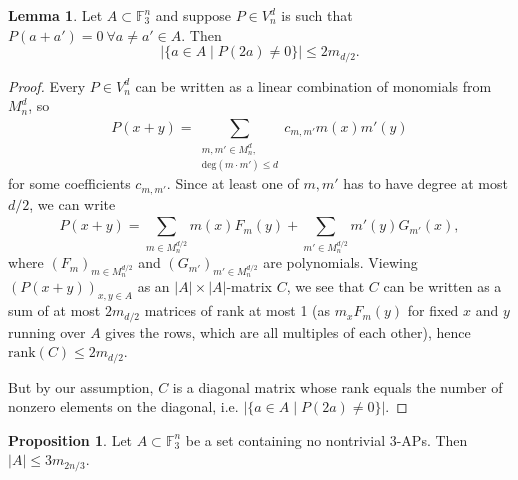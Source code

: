 \documentclass{article}
\theoremstyle{definition}
\newtheorem{lemma}[theorem]{Lemma}
\newtheorem{prop}[theorem]{Proposition}
\begin{document}
\begin{lemma}\label{lemma4.2}
    Let $A \subset \mathbb{F}_3^n$ and suppose $P \in V_n^d$ is such that $P(a+a') = 0 ~\forall a \neq a' \in A$. Then \[
    \left|\{a \in A \mid P(2a) \neq 0\}\right| \le 2 m_{d/2}.
    \]
\end{lemma}
\begin{proof}
    Every $P \in V_n^d$ can be written as a linear combination of monomials from $M_n^d$, so $$P(x+y) = \sum_{\substack{m,m' \in M_n^d, \\ \text{deg}(m\cdot m')\le d}}^{} c_{m,m'}m(x)m'(y)$$
    for some coefficients $c_{m,m'}$. Since at least one of $m,m'$ has to have degree at most $d/2$, we can write \[
    P(x+y) = \sum_{m \in M_n^{d/2}}^{} m(x)F_m(y) + \sum_{m' \in M_n^{d/2}}^{} m'(y) G_{m'}(x),
    \]
    where $(F_m)_{m \in M_n^{d/2}}$ and $(G_{m'})_{m' \in M_n^{d/2}}$ are polynomials. Viewing $(P(x+y))_{x,y \in A}$ as an $\left|A\right|\times\left|A\right|$-matrix $C$, we see that $C$ can be written as a sum of at most $2m_{d/2}$ matrices of rank at most 1 (as $m_x F_m(y)$ for fixed $x$ and $y$ running over $A$ gives the rows, which are all multiples of each other), hence $\text{rank}(C) \le 2m_{d/2}$.
    \vspace{1mm}
        
    But by our assumption, $C$ is a diagonal matrix whose rank equals the number of nonzero elements on the diagonal, i.e. $\left|\{a \in A \mid P(2a)\neq 0\}\right|$.
\end{proof}
\begin{prop}\label{prop4.3}
    Let $A \subset \mathbb{F}_3^n$ be a set containing no nontrivial 3-APs. Then $\left|A\right|\le 3m_{2n/3}$.
\end{prop}
\end{document}
